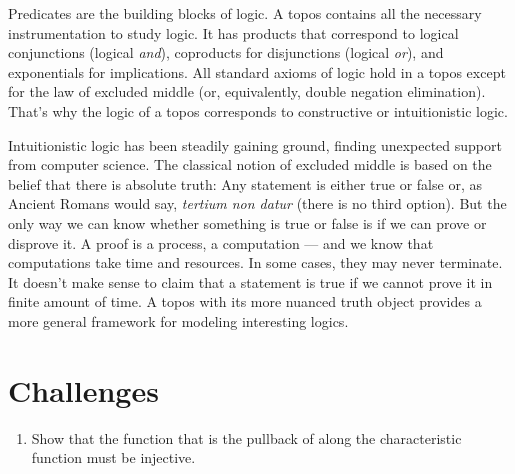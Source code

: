 Predicates are the building blocks of logic. A topos contains all the
necessary instrumentation to study logic. It has products that
correspond to logical conjunctions (logical \emph{and}), coproducts for
disjunctions (logical \emph{or}), and exponentials for implications. All
standard axioms of logic hold in a topos except for the law of excluded
middle (or, equivalently, double negation elimination). That's why the
logic of a topos corresponds to constructive or intuitionistic logic.

Intuitionistic logic has been steadily gaining ground, finding
unexpected support from computer science. The classical notion of
excluded middle is based on the belief that there is absolute truth: Any
statement is either true or false or, as Ancient Romans would say,
\emph{tertium non datur} (there is no third option). But the only way we
can know whether something is true or false is if we can prove or
disprove it. A proof is a process, a computation --- and we know that
computations take time and resources. In some cases, they may never
terminate. It doesn't make sense to claim that a statement is true if we
cannot prove it in finite amount of time. A topos with its more nuanced
truth object provides a more general framework for modeling interesting
logics.

\section{Challenges}\label{challenges}

\begin{enumerate}
\tightlist
\item
  Show that the function  that is the pullback of
   along the characteristic function must be injective.
\end{enumerate}
